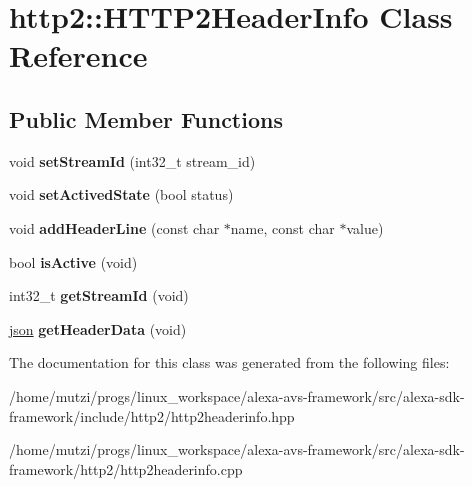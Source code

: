 \hypertarget{classhttp2_1_1HTTP2HeaderInfo}{}\section{http2\+:\+:H\+T\+T\+P2\+Header\+Info Class Reference}
\label{classhttp2_1_1HTTP2HeaderInfo}
\subsection*{Public Member Functions}
\begin{DoxyCompactItemize}
\item 
\mbox{\label{classhttp2_1_1HTTP2HeaderInfo_af7c74cd2210124a226c8ccc4ead272dd}} 
void {\bfseries set\+Stream\+Id} (int32\+\_\+t stream\+\_\+id)
\item 
\mbox{\label{classhttp2_1_1HTTP2HeaderInfo_adf25227199b8afd1efbffc8d5e798fd7}} 
void {\bfseries set\+Actived\+State} (bool status)
\item 
\mbox{\label{classhttp2_1_1HTTP2HeaderInfo_ac3005094ffe914d726af5d00fcd7531e}} 
void {\bfseries add\+Header\+Line} (const char $\ast$name, const char $\ast$value)
\item 
\mbox{\label{classhttp2_1_1HTTP2HeaderInfo_adc0366222e3d39f7ee9f4f5aa4b1f3ed}} 
bool {\bfseries is\+Active} (void)
\item 
\mbox{\label{classhttp2_1_1HTTP2HeaderInfo_a2488511cf22521775e2fb8a4b068e742}} 
int32\+\_\+t {\bfseries get\+Stream\+Id} (void)
\item 
\mbox{\label{classhttp2_1_1HTTP2HeaderInfo_a904bae9f582694077bc230d1bb9cf922}} 
\hyperlink{classnlohmann_1_1basic__json}{json} {\bfseries get\+Header\+Data} (void)
\end{DoxyCompactItemize}


The documentation for this class was generated from the following files\+:\begin{DoxyCompactItemize}
\item 
/home/mutzi/progs/linux\+\_\+workspace/alexa-\/avs-\/framework/src/alexa-\/sdk-\/framework/include/http2/http2headerinfo.\+hpp\item 
/home/mutzi/progs/linux\+\_\+workspace/alexa-\/avs-\/framework/src/alexa-\/sdk-\/framework/http2/http2headerinfo.\+cpp\end{DoxyCompactItemize}
